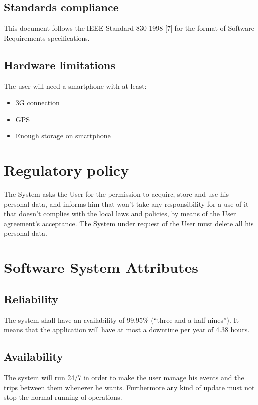 \subsection{Standards compliance}
This document follows the IEEE Standard 830-1998 [7] for the format of Software Requirements specifications.
%
\subsection{Hardware limitations}
The user will need a smartphone with at least:
\begin{itemize}
\item 3G connection
\item GPS
\item Enough storage on smartphone
\end{itemize}
%
%
\section{Regulatory policy}
The System asks the User for the permission to acquire, store and use his personal data, and informs him that won't take any responsibility for a use of it that doesn't complies with the local laws and policies, by means of the User agreement's acceptance.
The System under request of the User must delete all his personal data.
%
%
\section{Software System Attributes}
%
\subsection{Reliability}
The system shall have an availability of 99.95\% (“three and a half nines”). It means that the application will have at most a downtime per year of 4.38 hours.
%
\subsection{Availability}
The system will run 24/7 in order to make the user manage his events and the trips between them whenever he wants. Furthermore any kind of update must not stop the normal running of operations.
%
